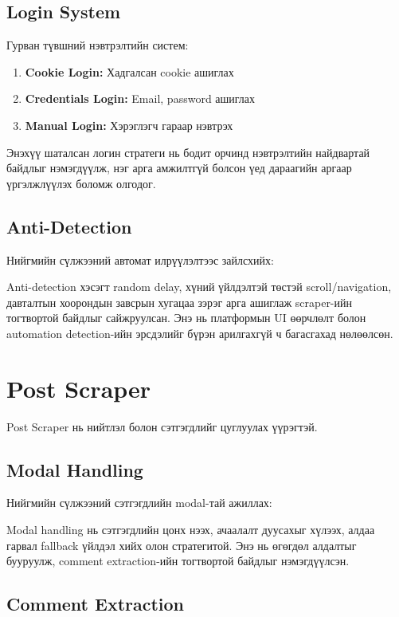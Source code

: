 \documentclass[12pt,a4paper]{report}
\begin{document}
\subsection{Login System}

Гурван түвшний нэвтрэлтийн систем:

\begin{enumerate}
    \item \textbf{Cookie Login:} Хадгалсан cookie ашиглах
    \item \textbf{Credentials Login:} Email, password ашиглах
    \item \textbf{Manual Login:} Хэрэглэгч гараар нэвтрэх
\end{enumerate}

Энэхүү шаталсан логин стратеги нь бодит орчинд нэвтрэлтийн найдвартай байдлыг нэмэгдүүлж, нэг арга амжилтгүй болсон үед дараагийн аргаар үргэлжлүүлэх боломж олгодог.


\subsection{Anti-Detection}

Нийгмийн сүлжээний автомат илрүүлэлтээс зайлсхийх:

Anti-detection хэсэгт random delay, хүний үйлдэлтэй төстэй scroll/navigation, давталтын хоорондын завсрын хугацаа зэрэг арга ашиглаж scraper-ийн тогтвортой байдлыг сайжруулсан. Энэ нь платформын UI өөрчлөлт болон automation detection-ийн эрсдэлийг бүрэн арилгахгүй ч багасгахад нөлөөлсөн.


\section{Post Scraper}

Post Scraper нь нийтлэл болон сэтгэгдлийг цуглуулах үүрэгтэй.

\subsection{Modal Handling}

Нийгмийн сүлжээний сэтгэгдлийн modal-тай ажиллах:

Modal handling нь сэтгэгдлийн цонх нээх, ачаалалт дуусахыг хүлээх, алдаа гарвал fallback үйлдэл хийх олон стратегитой. Энэ нь өгөгдөл алдалтыг бууруулж, comment extraction-ийн тогтвортой байдлыг нэмэгдүүлсэн.


\subsection{Comment Extraction}
\end{document}
